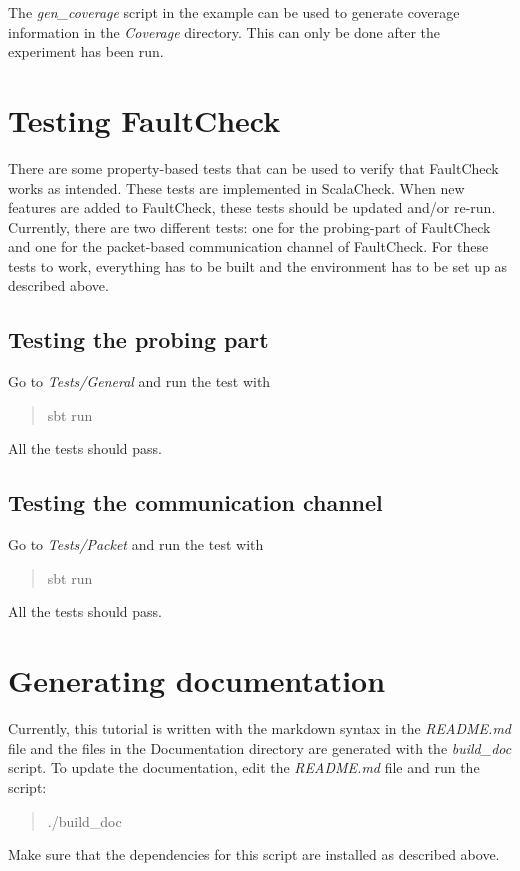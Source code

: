 The \emph{gen\_coverage} script in the example can be used to generate
coverage information in the \emph{Coverage} directory. This can only be
done after the experiment has been run.

\section{Testing FaultCheck}\label{testing-faultcheck}

There are some property-based tests that can be used to verify that
FaultCheck works as intended. These tests are implemented in ScalaCheck.
When new features are added to FaultCheck, these tests should be updated
and/or re-run. Currently, there are two different tests: one for the
probing-part of FaultCheck and one for the packet-based communication
channel of FaultCheck. For these tests to work, everything has to be
built and the environment has to be set up as described above.

\subsection{Testing the probing part}\label{testing-the-probing-part}

Go to \emph{Tests/General} and run the test with

\begin{quote}
sbt run
\end{quote}

All the tests should pass.

\subsection{Testing the communication
channel}\label{testing-the-communication-channel}

Go to \emph{Tests/Packet} and run the test with

\begin{quote}
sbt run
\end{quote}

All the tests should pass.

\section{Generating documentation}\label{generating-documentation}

Currently, this tutorial is written with the markdown syntax in the
\emph{README.md} file and the files in the Documentation directory are
generated with the \emph{build\_doc} script. To update the
documentation, edit the \emph{README.md} file and run the script:

\begin{quote}
./build\_doc
\end{quote}

Make sure that the dependencies for this script are installed as
described above.

